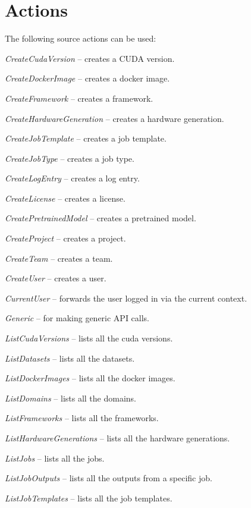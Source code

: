 \documentclass[a4paper]{book}
\begin{document}
\section{Actions}
The following source actions can be used:
\begin{tight_itemize}
  \item \textit{CreateCudaVersion} -- creates a CUDA version.
  \item \textit{CreateDockerImage} -- creates a docker image.
  \item \textit{CreateFramework} -- creates a framework.
  \item \textit{CreateHardwareGeneration} -- creates a hardware generation.
  \item \textit{CreateJobTemplate} -- creates a job template.
  \item \textit{CreateJobType} -- creates a job type.
  \item \textit{CreateLogEntry} -- creates a log entry.
  \item \textit{CreateLicense} -- creates a license.
  \item \textit{CreatePretrainedModel} -- creates a pretrained model.
  \item \textit{CreateProject} -- creates a project.
  \item \textit{CreateTeam} -- creates a team.
  \item \textit{CreateUser} -- creates a user.
  \item \textit{CurrentUser} -- forwards the user logged in via the current context.
  \item \textit{Generic} -- for making generic API calls.
  \item \textit{ListCudaVersions} -- lists all the cuda versions.
  \item \textit{ListDatasets} -- lists all the datasets.
  \item \textit{ListDockerImages} -- lists all the docker images.
  \item \textit{ListDomains} -- lists all the domains.
  \item \textit{ListFrameworks} -- lists all the frameworks.
  \item \textit{ListHardwareGenerations} -- lists all the hardware generations.
  \item \textit{ListJobs} -- lists all the jobs.
  \item \textit{ListJobOutputs} -- lists all the outputs from a specific job.
  \item \textit{ListJobTemplates} -- lists all the job templates.

\end{tight_itemize}
\end{document}
